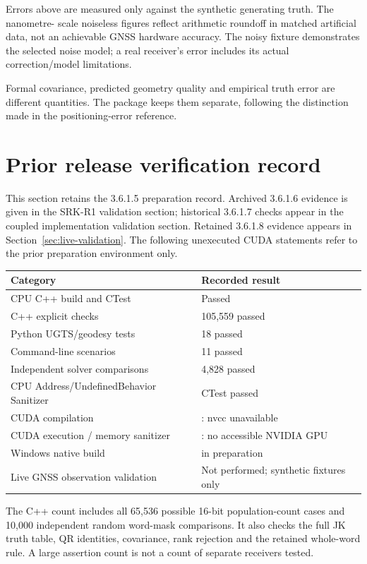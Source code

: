 Errors above are measured only against the synthetic generating truth. The nanometre-
scale noiseless figures reflect arithmetic roundoff in matched artificial data, not
an achievable GNSS hardware accuracy. The noisy fixture demonstrates the selected
noise model; a real receiver's error includes its actual correction/model limitations.

Formal covariance, predicted geometry quality and empirical truth error are different
quantities. The package keeps them separate, following the distinction made in the
positioning-error reference. 
\clearpage

\section{Prior release verification record}
This section retains the 3.6.1.5 preparation record. Archived 3.6.1.6 evidence
is given in the SRK-R1 validation section; historical 3.6.1.7 checks appear in the
coupled implementation validation section. Retained 3.6.1.8 evidence appears in
Section~\ref{sec:live-validation}. The following unexecuted
CUDA statements refer to the prior preparation environment only.

\begin{center}
\begin{tabularx}{\textwidth}{@{}P{.48\textwidth}Y@{}}\toprule
\textbf{Category} & \textbf{Recorded result}\\\midrule
CPU C++ build and CTest & Passed\\
C++ explicit checks & 105,559 passed\\
Python UGTS/geodesy tests & 18 passed\\
Command-line scenarios & 11 passed\\
Independent solver comparisons & 4,828 passed\\
CPU Address/UndefinedBehavior Sanitizer & CTest passed\\
CUDA compilation & : nvcc unavailable\\
CUDA execution / memory sanitizer & : no accessible NVIDIA GPU\\
Windows native build &  in preparation\\
Live GNSS observation validation & Not performed; synthetic fixtures only\\\bottomrule
\end{tabularx}
\end{center}

The C++ count includes all 65,536 possible 16-bit population-count cases and 10,000
independent random word-mask comparisons. It also checks the full JK truth table,
QR identities, covariance, rank rejection and the retained whole-word rule. A large
assertion count is not a count of separate receivers tested.

